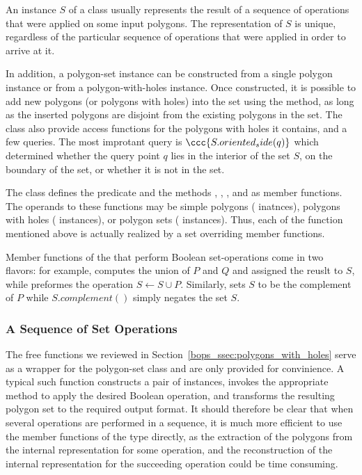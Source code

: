 An instance $S$ of a  class usually represents
the result of a sequence of operations that were applied on some input
polygons. The representation of $S$ is unique, regardless of the particular
sequence of operations that were applied in order to arrive at it.

In addition, a polygon-set instance can be constructed from a single polygon
instance or from a polygon-with-holes instance. Once constructed, it is
possible to add new polygons (or polygons with holes)
into the set using the  method, as long as the inserted
polygons are disjoint from the existing polygons in the set. 
The  class also provide access functions for
the polygons with holes it contains, and a few queries. The most improtant
query is $\ccc{S.oriented_side(q)}$ which determined whether the query point
$q$ lies in the interior of the set $S$, on the boundary of the set, or
whether it is not in the set.

The  class defines the predicate
 and the methods , ,
,  and  as member
functions. The operands to these functions may be simple polygons 
( inatnces), polygons with holes 
( instances), or polygon sets
( instances). Thus, each of the function mentioned
above is actually realized by a set overriding member functions.

Member functions of the  that perform
Boolean set-operations come in two flavors: for example, 
computes the union of $P$ and $Q$ and assigned the reuslt to $S$, while
 preformes the operation $S \longleftarrow S \cup P$.
Similarly,  sets $S$ to be the complement of $P$ while
$S.complement()$ simply negates the set $S$.

\subsubsection{A Sequence of Set Operations}
\label{bops_sssec:sequence}

The free functions we reviewed in Section~\ref{bops_ssec:polygons_with_holes}
serve as a wrapper for the polygon-set class and are only provided for
convinience. A typical such function constructs a pair of 
 instances, invokes the 
appropriate method to apply the desired Boolean operation, and transforms
the resulting polygon set to the required output format.
It should therefore be clear that when several operations are 
performed in a sequence, it is much more efficient to use the member 
functions of the  type directly, as the 
extraction of the polygons from the internal representation for some 
operation, and the reconstruction of the internal representation for 
the succeeding operation could be time consuming.


